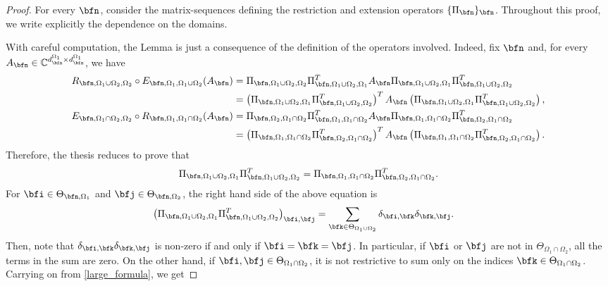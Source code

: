 \documentclass{amsart}
\begin{document}
\begin{proof}
    For every $\bfn$, consider the matrix-sequences defining the restriction and extension operators $\{\Pi_\bfn\}_\bfn$. Throughout this proof, we write explicitly the dependence on the domains. 
    
    With careful computation, the Lemma is just a consequence of the definition of the operators involved. Indeed, fix $\bfn$ and, for every $A_\bfn\in\mathbb{C}^{d_\bfn^{\Omega_1}\times d_\bfn^{\Omega_1}}$, we have 
    \begin{align*}
       R_{\bfn,\Omega_1\cup\Omega_2,\Omega_2}\circ E_{\bfn,\Omega_1,\Omega_1\cup\Omega_2}(A_\bfn)&=\Pi_{\bfn,\Omega_1\cup\Omega_2,\Omega_2}\Pi_{\bfn,\Omega_1\cup\Omega_2,\Omega_1}^T A_{\bfn}\Pi_{\bfn,\Omega_1\cup\Omega_2,\Omega_1}\Pi_{\bfn,\Omega_1\cup\Omega_2,\Omega_2}^T\\
       &=\left(\Pi_{\bfn,\Omega_1\cup\Omega_2,\Omega_1}\Pi_{\bfn,\Omega_1\cup\Omega_2,\Omega_2}^T\right)^TA_\bfn\left(\Pi_{\bfn,\Omega_1\cup\Omega_2,\Omega_1}\Pi_{\bfn,\Omega_1\cup\Omega_2,\Omega_2}^T\right),\\
        E_{\bfn,\Omega_1\cap\Omega_2,\Omega_2}\circ R_{\bfn,\Omega_1,\Omega_1\cap\Omega_2}(A_\bfn)&=\Pi_{\bfn,\Omega_2,\Omega_1\cap\Omega_2}\Pi_{\bfn,\Omega_1,\Omega_1\cap\Omega_2}^T A_{\bfn}\Pi_{\bfn,\Omega_1,\Omega_1\cap\Omega_2}\Pi_{\bfn,\Omega_2,\Omega_1\cap\Omega_2}^T\\
        &=\left(\Pi_{\bfn,\Omega_1,\Omega_1\cap\Omega_2}\Pi_{\bfn,\Omega_2,\Omega_1\cap\Omega_2}^T\right)^TA_\bfn\left(\Pi_{\bfn,\Omega_1,\Omega_1\cap\Omega_2}\Pi_{\bfn,\Omega_2,\Omega_1\cap\Omega_2}^T\right).
    \end{align*}
    Therefore, the thesis reduces to prove that 
    \begin{equation}\label{quella_equation}
    \Pi_{\bfn,\Omega_1\cup\Omega_2,\Omega_1}\Pi_{\bfn,\Omega_1\cup\Omega_2,\Omega_2}^T=\Pi_{\bfn,\Omega_1,\Omega_1\cap\Omega_2}\Pi_{\bfn,\Omega_2,\Omega_1\cap\Omega_2}^T.
    \end{equation}
    For $\bfi\in\Theta_{\bfn,\Omega_1}$ and $\bfj\in\Theta_{\bfn,\Omega_2}$, the right hand side of the above equation is
    \begin{align}\label{large_formula}
        \left(\Pi_{\bfn,\Omega_1\cup\Omega_2,\Omega_1}\Pi_{\bfn,\Omega_1\cup\Omega_2,\Omega_2}^T\right)_{\bfi,\bfj}&=\sum_{\bfk\in\Theta_{\Omega_1\cup\Omega_2}}\delta_{\bfi,\bfk}\delta_{\bfk,\bfj}.
    \end{align}
    Then, note that $\delta_{\bfi,\bfk}\delta_{\bfk,\bfj}$ is non-zero if and only if $\bfi=\bfk=\bfj$. In particular, if $\bfi$ or $\bfj$ are not in $\Theta_{\Omega_1\cap\Omega_2}$, all the terms in the sum are zero. On the other hand, if $\bfi,\bfj\in\Theta_{\Omega_1\cap\Omega_2}$, it is not restrictive to sum only on the indices $\bfk\in\Theta_{\Omega_1\cap\Omega_2}$. Carrying on from \eqref{large_formula}, we get

\end{proof}
\end{document}
